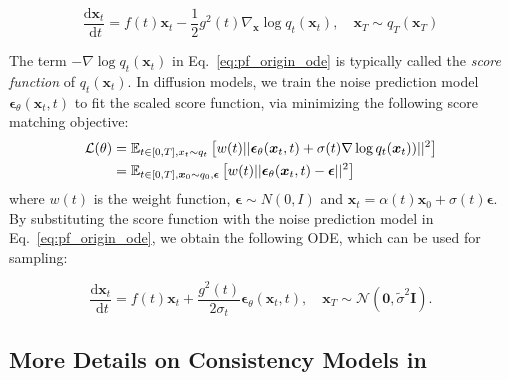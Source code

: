 \documentclass{article} %
\begin{document}
\begin{small}
\begin{equation}
    \frac{\mathrm{d} \boldsymbol{x}_t}{\mathrm{~d} t}=f(t) \boldsymbol{x}_t-\frac{1}{2} g^2(t) \nabla_{\boldsymbol{x}} \log q_t\left(\boldsymbol{x}_t\right), \quad \boldsymbol{x}_T \sim q_T\left(\boldsymbol{x}_T\right) \label{eq:pf_origin_ode}
\end{equation}
\end{small}
The term $-\nabla \log q_t(\boldsymbol{x}_t)$ in Eq.~\ref{eq:pf_origin_ode} is 
typically called the {\em score function} of $q_t(\boldsymbol{x}_t)$. In diffusion models, we train the noise prediction model $\boldsymbol{\epsilon}_\theta(\boldsymbol{x}_t, t)$ to fit the scaled score function, via minimizing the following score matching objective:
\begin{align}
    \mathcal{L}(\theta) & = \mathbb{E}_{t\in [0,T], x_t\sim q_t} 
    \left[w(t)||\boldsymbol{\epsilon}_\theta(\boldsymbol{x}_t, t) 
    + \sigma(t)\nabla \log q_t(\boldsymbol{x}_t))||^2\right]  \notag\\
    & =\mathbb{E}_{t\in [0,T], \boldsymbol{x}_0\sim q_0, \boldsymbol{\epsilon} } \left[w(t)||\boldsymbol{\epsilon}_\theta(\boldsymbol{x}_t, t)- 
    \boldsymbol{\epsilon}||^2\right]  
    \label{eq:score_matching}
\end{align}
where $w(t)$ is the weight function, $\boldsymbol{\epsilon}\sim N(0, I)$
and $\boldsymbol{x}_t=\alpha(t) \boldsymbol{x}_0+\sigma(t) \boldsymbol{\epsilon}$.
By substituting the score function with the noise prediction model in Eq.~\ref{eq:pf_origin_ode}, we obtain the following ODE, which can be used for sampling:
\begin{small}
\begin{equation}
    \frac{\mathrm{d} \boldsymbol{x}_t}{\mathrm{~d} t}= f(t) \boldsymbol{x}_t+\frac{g^2(t)}{2 \sigma_t} \boldsymbol{\epsilon}_\theta\left(\boldsymbol{x}_t, t\right), \quad \boldsymbol{x}_T \sim \mathcal{N}\left(\mathbf{0}, \tilde{\sigma}^2 \boldsymbol{I}\right).
    \label{eq:pf_empirical_ode}
\end{equation}
\end{small}

\subsection{More Details on Consistency Models in \citep{song2023consistency}}
\end{document}
